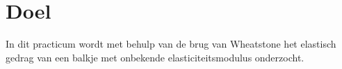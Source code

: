 
\section{Doel}

In dit practicum wordt met behulp van de brug van Wheatstone
het elastisch gedrag van een balkje met onbekende elasticiteitsmodulus
onderzocht.
